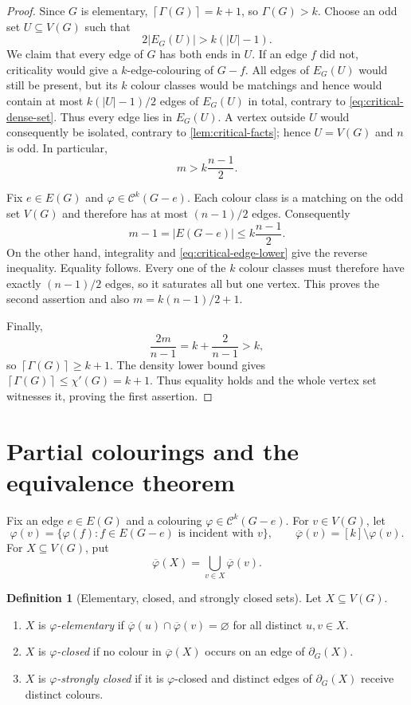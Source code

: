 \documentclass[11pt]{article}
\theoremstyle{definition}
\newtheorem{definition}[theorem]{Definition}
\newcommand{\calC}{\mathcal C}
\newcommand{\abs}[1]{\lvert #1\rvert}
\newcommand{\ceil}[1]{\left\lceil #1\right\rceil}
\newcommand{\missing}[1]{\overline{#1}}
\newcommand{\boundary}{\partial}
\begin{document}
\begin{proof}
Since $G$ is elementary, $\ceil{\Gamma(G)}=k+1$, so $\Gamma(G)>k$.
Choose an odd set $U\subseteq V(G)$ such that
\[
  2\abs{E_G(U)}>k(\abs U-1).
  \tag{2.1}\label{eq:critical-dense-set}
\]
We claim that every edge of $G$ has both ends in $U$.  If an edge $f$ did not,
criticality would give a $k$-edge-colouring of $G-f$.  All edges of $E_G(U)$
would still be present, but its $k$ colour classes would be matchings and hence
would contain at most $k(\abs U-1)/2$ edges of $E_G(U)$ in total, contrary to
\eqref{eq:critical-dense-set}.  Thus every edge lies in $E_G(U)$.  A vertex
outside $U$ would consequently be isolated, contrary to
\cref{lem:critical-facts}; hence $U=V(G)$ and $n$ is odd.  In particular,
\[
  m>k\frac{n-1}{2}.
  \tag{2.2}\label{eq:critical-edge-lower}
\]

Fix $e\in E(G)$ and $\varphi\in\calC^k(G-e)$.  Each colour class is a
matching on the odd set $V(G)$ and therefore has at most $(n-1)/2$ edges.
Consequently
\[
  m-1=\abs{E(G-e)}\le k\frac{n-1}{2}.
\]
On the other hand, integrality and \eqref{eq:critical-edge-lower} give the
reverse inequality.  Equality follows.  Every one of the $k$ colour classes
must therefore have exactly $(n-1)/2$ edges, so it saturates all but one
vertex.  This proves the second assertion and also
$m=k(n-1)/2+1$.

Finally,
\[
  \frac{2m}{n-1}=k+\frac{2}{n-1}>k,
\]
so $\ceil{\Gamma(G)}\ge k+1$.  The density lower bound gives
$\ceil{\Gamma(G)}\le\chi'(G)=k+1$.  Thus equality holds and the whole vertex
set witnesses it, proving the first assertion.
\end{proof}

\section{Partial colourings and the equivalence theorem}

Fix an edge $e\in E(G)$ and a colouring
$\varphi\in\calC^k(G-e)$.  For $v\in V(G)$, let
\[
  \varphi(v)=\{\varphi(f): f\in E(G-e)\text{ is incident with }v\},
  \qquad
  \missing\varphi(v)=[k]\setminus\varphi(v).
\]
For $X\subseteq V(G)$, put
\[
  \missing\varphi(X)=\bigcup_{v\in X}\missing\varphi(v).
\]

\begin{definition}[Elementary, closed, and strongly closed sets]
Let $X\subseteq V(G)$.
\begin{enumerate}
  \item $X$ is \emph{$\varphi$-elementary} if
  $\missing\varphi(u)\cap\missing\varphi(v)=\varnothing$ for all distinct
  $u,v\in X$.
  \item $X$ is \emph{$\varphi$-closed} if no colour in
  $\missing\varphi(X)$ occurs on an edge of $\boundary_G(X)$.
  \item $X$ is \emph{$\varphi$-strongly closed} if it is $\varphi$-closed and
  distinct edges of $\boundary_G(X)$ receive distinct colours.
\end{enumerate}
\end{definition}
\end{document}
